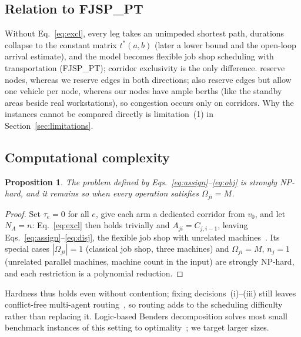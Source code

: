 \documentclass[preprint,review,12pt,authoryear,doubleblind]{elsarticle}
\newtheorem{prop}{Proposition}
\begin{document}
\subsection{Relation to FJSP\_PT}
\label{sec:fjsppt}

Without Eq.~\eqref{eq:excl}, every leg takes an unimpeded shortest path, durations collapse to the constant matrix $t^{*}(a,b)$ (later a lower bound and the open-loop arrival estimate), and the model becomes flexible job shop scheduling with transportation (FJSP\_PT); corridor exclusivity is the only difference.
\citet{vanos2026exact} reserve nodes, whereas we reserve edges in both directions; \citet{lyu2019approach} also reserve edges but allow one vehicle per node, whereas our nodes have ample berths (like the standby areas beside real workstations), so congestion occurs only on corridors.
Why the instances cannot be compared directly is limitation~(1) in Section~\ref{sec:limitations}.

\subsection{Computational complexity}

\begin{prop}
\label{prop:np_hard}
The problem defined by Eqs.~\eqref{eq:assign}--\eqref{eq:obj} is strongly NP-hard, and it remains so when every operation satisfies
$\Omega_{ji}=M$.
\end{prop}

\begin{proof}
Set $\tau_e=0$ for all $e$, give each arm a dedicated corridor from $v_0$, and let $N_A=n$: Eq.~\eqref{eq:excl} then holds trivially and $A_{ji}=C_{j,i-1}$, leaving Eqs.~\eqref{eq:assign}--\eqref{eq:disj}, the flexible job shop with unrelated machines~\citep{dauzereperes2024fjsp}.
Its special cases $|\Omega_{ji}|=1$ (classical job shop, three machines) and $\Omega_{ji}=M$, $n_j=1$ (unrelated parallel machines, machine count in the input) are strongly NP-hard, and each restriction is a polynomial reduction.
\end{proof}

Hardness thus holds even without contention; fixing decisions~(i)--(iii) still leaves conflict-free multi-agent routing~\citep{gao2023mapf}, so routing adds to the scheduling difficulty rather than replacing it.
Logic-based Benders decomposition solves most small benchmark instances of this setting to optimality~\citep{vanos2026exact}; we target larger sizes.
\end{document}
